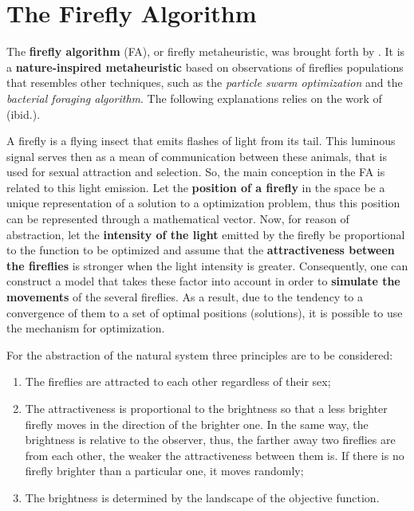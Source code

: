 \documentclass[tuberlin,cic,tc,openright,english,noabntcite,oneside]{iiufrgs}
\begin{document}
\section{The Firefly Algorithm}
The \textbf{firefly algorithm} (FA), or firefly metaheuristic, was brought forth by \textcite{yang_firefly_2009}. It is a \textbf{nature-inspired metaheuristic} based on observations of fireflies populations that resembles other techniques, such as the \emph{particle swarm optimization} and the \emph{bacterial foraging algorithm}. The following explanations relies on the work of (ibid.).

A firefly is a flying insect that emits flashes of light from its tail. This luminous signal serves then as a mean of communication between these animals, that is used for sexual attraction and selection. So, the main conception in the FA is related to this light emission. Let the \textbf{position of a firefly} in the space be a unique representation of a solution to a optimization problem, thus this position can be represented through a mathematical vector. Now, for reason of abstraction, let the \textbf{intensity of the light} emitted by the firefly be proportional to the function to be optimized and assume that the \textbf{attractiveness between the fireflies} is stronger when the light intensity is greater. Consequently, one can construct a model that takes these factor into account in order to \textbf{simulate the movements} of the several fireflies. As a result, due to the tendency to a convergence of them to a set of optimal positions (solutions), it is possible to use the mechanism for optimization.

For the abstraction of the natural system three principles are to be considered:
\begin{enumerate}
	\item The fireflies are attracted to each other regardless of their sex;
	\item The attractiveness is proportional to the brightness so that a less brighter firefly moves in the direction of the brighter one. In the same way, the brightness is relative to the observer, thus, the farther away two fireflies are from each other, the weaker the attractiveness between them is. If there is no firefly brighter than a particular one, it moves randomly;
	\item The brightness is determined by the landscape of the objective function.
\end{enumerate}
\end{document}
